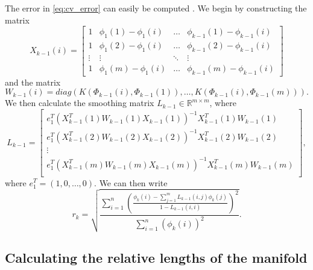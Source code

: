 \documentclass[preprint]{elsarticle}
\begin{document}
The error in \eqref{eq:cv_error} can easily be computed \cite{wasserman2006all}.
%
We begin by constructing the matrix
\begin{equation}
X_{k-1}(i) = \begin{bmatrix}
1 & \phi_1(1) - \phi_1(i) & \dots & \phi_{k-1}(1)- \phi_{k-1}(i) \\
1 & \phi_1(2) - \phi_1(i) & \dots & \phi_{k-1}(2)- \phi_{k-1}(i) \\
\vdots & \vdots & \ddots & \vdots \\
1 & \phi_1(m) - \phi_1(i) & \dots & \phi_{k-1}(m)- \phi_{k-1}(i) 
\end{bmatrix}
\end{equation}
%
and the matrix 
\begin{equation}
W_{k-1}(i) = diag \left( K(\Phi_{k-1}(i), \Phi_{k-1}(1)), \dots, K(\Phi_{k-1}(i), \Phi_{k-1}(m)) \right).
\end{equation}
%
We then calculate the smoothing matrix $L_{k-1} \in \mathbb{R}^{m \times m}$, where 
\begin{equation}
L_{k-1} =
\begin{bmatrix}
e_1^T \left( X_{k-1}^T(1) W_{k-1}(1) X_{k-1}(1) \right) ^{-1} X_{k-1}^T(1) W_{k-1}(1) \\
e_1^T \left( X_{k-1}^T(2) W_{k-1}(2) X_{k-1}(2) \right) ^{-1} X_{k-1}^T(2) W_{k-1}(2) \\
\vdots \\
e_1^T \left( X_{k-1}^T(m) W_{k-1}(m) X_{k-1}(m) \right) ^{-1} X_{k-1}^T(m) W_{k-1}(m) \\
\end{bmatrix},
\end{equation}
%
where $e_1^T = (1, 0, \dots, 0)$. 
%
We can then write
%
\begin{equation} 
r_{k} = \sqrt{ \frac{\sum_{i=1}^n \left( \frac{ \phi_{k} (i) - \sum_{j=1}^m L_{k-1}(i,j) \phi_{k}(j) }{1-L_{k-1}(i,i)} \right)^2} {\sum_{i=1}^n  \left( \phi_{k} (i) \right)^2 }} .
\end{equation}

\subsection{Calculating the relative lengths of the manifold} \label{sec:relative_lengths}
\end{document}
